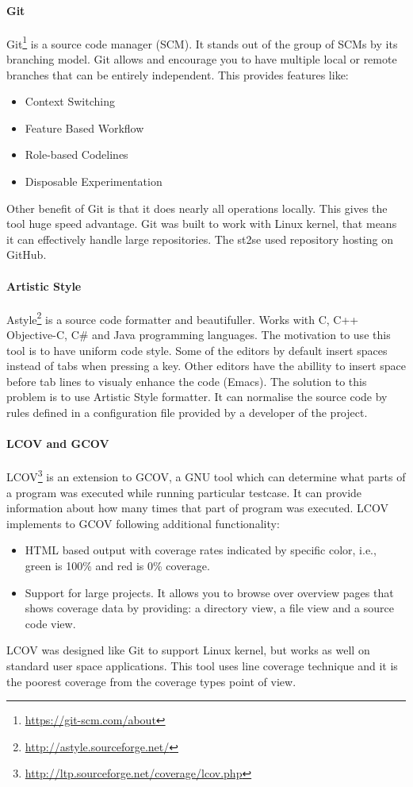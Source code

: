 \paragraph{Git}
Git\footnote{\url{https://git-scm.com/about}} is a source code manager (SCM). It stands out of the group of SCMs by its branching model.
Git allows and encourage you to have multiple local or remote branches that can be entirely independent.
This provides features like:
\begin{itemize}
	\item Context Switching
	\item Feature Based Workflow
	\item Role-based Codelines
	\item Disposable Experimentation
\end{itemize}
Other benefit of Git is that it does nearly all operations locally.
This gives the tool huge speed advantage.
Git was built to work with Linux kernel, that means it can effectively handle large repositories.
The st2se used repository hosting on GitHub.

\paragraph{Artistic Style}
Astyle\footnote{\url{http://astyle.sourceforge.net/}} is a source code formatter
and beautifuller. Works with C, C++ Objective-C, C\# and Java programming
languages. The motivation to use this tool is to have uniform code style. Some
of the editors by default insert spaces instead of tabs when pressing a key.
Other editors have the abillity to insert space before tab lines to visualy
enhance the code (Emacs). The solution to this problem is to use Artistic Style
formatter. It can normalise the source code by rules defined in a configuration
file provided by a developer of the project.

\paragraph{LCOV and GCOV}
LCOV\footnote{\url{http://ltp.sourceforge.net/coverage/lcov.php}} is an extension to GCOV, a GNU tool which can determine what parts of a program was executed while running particular testcase.
It can provide information about how many times that part of program was executed.
LCOV implements to GCOV following additional functionality:
\begin{itemize}
	\item HTML based output with coverage rates indicated by specific color, i.e., green is 100\% and red is 0\% coverage.
	\item Support for large projects. It allows you to browse over overview pages that shows coverage data
	by providing: a directory view, a file view and a source code view.
\end{itemize}
LCOV was designed like Git to support Linux kernel, but works as well on standard user space applications.
This tool uses line coverage technique and it is the poorest coverage from the coverage types point of view.

